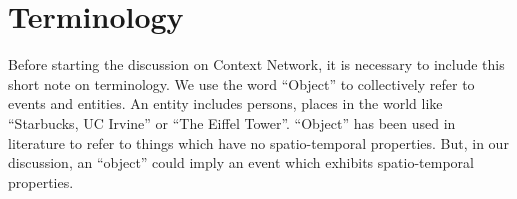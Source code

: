\section{Terminology}
Before starting the discussion on Context Network, it is necessary to include this short note on terminology. We use the word ``Object'' to collectively refer to events and entities. An entity includes persons, places in the world like ``Starbucks, UC Irvine'' or  ``The Eiffel Tower''. ``Object'' has been used in literature to refer to things which have no spatio-temporal properties. But, in our discussion, an ``object'' could imply an event which exhibits spatio-temporal properties.

